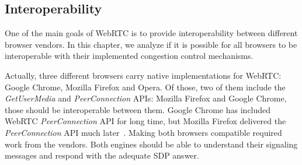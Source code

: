 %
%
%
%

\subsection{Interoperability}

One of the main goals of WebRTC is to provide interoperability between different browser vendors. In this chapter, we analyze if it is possible for all browsers to be interoperable with their implemented congestion control mechanisms.

Actually, three different browsers carry native implementations for WebRTC: Google Chrome, Mozilla Firefox and Opera. Of those, two of them include the {\it GetUserMedia} and {\it PeerConnection} APIs: Mozilla Firefox and Google Chrome, those should be interoperable between them. Google Chrome has included WebRTC {\it PeerConnection} API for long time, but Mozilla Firefox delivered the {\it PeerConnection} API much later~\cite{chromefirefoxinterop}. Making both browsers compatible required work from the vendors. Both engines should be able to understand their signaling messages and respond with the adequate SDP answer.

